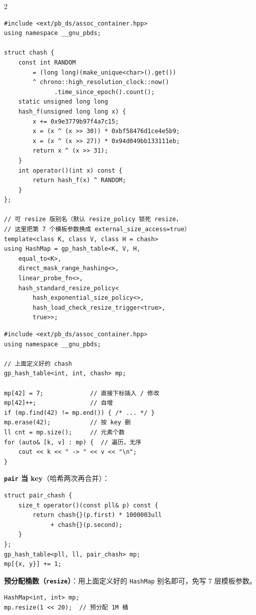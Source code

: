 \begin{multicols*}{2}
		\begin{verbatim}
#include <ext/pb_ds/assoc_container.hpp>
using namespace __gnu_pbds;

struct chash {
    const int RANDOM
        = (long long)(make_unique<char>().get())
        ^ chrono::high_resolution_clock::now()
              .time_since_epoch().count();
    static unsigned long long
    hash_f(unsigned long long x) {
        x += 0x9e3779b97f4a7c15;
        x = (x ^ (x >> 30)) * 0xbf58476d1ce4e5b9;
        x = (x ^ (x >> 27)) * 0x94d049bb133111eb;
        return x ^ (x >> 31);
    }
    int operator()(int x) const {
        return hash_f(x) ^ RANDOM;
    }
};

// 可 resize 版别名（默认 resize_policy 锁死 resize，
// 这里把第 7 个模板参数换成 external_size_access=true）
template<class K, class V, class H = chash>
using HashMap = gp_hash_table<K, V, H,
    equal_to<K>,
    direct_mask_range_hashing<>,
    linear_probe_fn<>,
    hash_standard_resize_policy<
        hash_exponential_size_policy<>,
        hash_load_check_resize_trigger<true>,
        true>>;
		\end{verbatim}

		\begin{verbatim}
#include <ext/pb_ds/assoc_container.hpp>
using namespace __gnu_pbds;

// 上面定义好的 chash
gp_hash_table<int, int, chash> mp;

mp[42] = 7;             // 直接下标插入 / 修改
mp[42]++;               // 自增
if (mp.find(42) != mp.end()) { /* ... */ }
mp.erase(42);           // 按 key 删
ll cnt = mp.size();     // 元素个数
for (auto& [k, v] : mp) {  // 遍历，无序
    cout << k << " -> " << v << "\n";
}
		\end{verbatim}

		\textbf{\texttt{pair} 当 key}（哈希两次再合并）：

		\begin{verbatim}
struct pair_chash {
    size_t operator()(const pll& p) const {
        return chash{}(p.first) * 1000003ull
             + chash{}(p.second);
    }
};
gp_hash_table<pll, ll, pair_chash> mp;
mp[{x, y}] += 1;
		\end{verbatim}

		\textbf{预分配桶数（\texttt{resize}）}：用上面定义好的 \verb|HashMap| 别名即可，免写 7 层模板参数。

		\begin{verbatim}
HashMap<int, int> mp;
mp.resize(1 << 20);  // 预分配 1M 桶
		\end{verbatim}


\end{multicols*}
